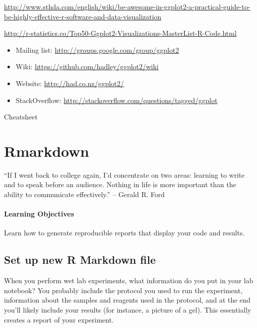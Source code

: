 \documentclass[
]{book}
\providecommand{\tightlist}{%
  \setlength{\itemsep}{0pt}\setlength{\parskip}{0pt}}
\begin{document}
\url{http://www.sthda.com/english/wiki/be-awesome-in-ggplot2-a-practical-guide-to-be-highly-effective-r-software-and-data-visualization}

\url{http://r-statistics.co/Top50-Ggplot2-Visualizations-MasterList-R-Code.html}

\begin{itemize}
\tightlist
\item
  Mailing list: \url{http://groups.google.com/group/ggplot2}
\item
  Wiki: \url{https://github.com/hadley/ggplot2/wiki}
\item
  Website: \url{http://had.co.nz/ggplot2/}
\item
  StackOverflow: \url{http://stackoverflow.com/questions/tagged/ggplot}
\end{itemize}

Cheatsheet

\hypertarget{rmarkdown}{%
\chapter{Rmarkdown}\label{rmarkdown}}

``If I went back to college again, I'd concentrate on two areas: learning to write and to speak before an audience. Nothing in life is more important than the ability to communicate effectively.''
-- Gerald R. Ford

\hypertarget{learning-objectives-3}{%
\subsubsection*{Learning Objectives}\label{learning-objectives-3}}

Learn how to generate reproducible reports that display your code and results.

\hypertarget{set-up-new-r-markdown-file}{%
\section{Set up new R Markdown file}\label{set-up-new-r-markdown-file}}

When you perform wet lab experiments, what information do you put in your lab notebook? You probably include the protocol you used to run the experiment, information about the samples and reagents used in the protocol, and at the end you'll likely include your results (for instance, a picture of a gel). This essentially creates a report of your experiment.
\end{document}
